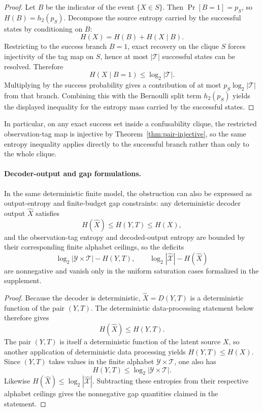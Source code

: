 \begin{proof}
Let $B$ be the indicator of the event $\{X\in S\}$. Then $\Pr[B=1]=p_S$, so $H(B)=h_2(p_S)$. Decompose the source entropy carried by the successful states by conditioning on $B$:
\[
H(X)=H(B)+H(X\mid B).
\]
Restricting to the success branch $B=1$, exact recovery on the clique $S$ forces injectivity of the tag map on $S$, hence at most $|\mathcal T|$ successful states can be resolved. Therefore
\[
H(X\mid B=1) \le \log_2 |\mathcal T|.
\]
Multiplying by the success probability gives a contribution of at most $p_S\log_2 |\mathcal T|$ from that branch. Combining this with the Bernoulli split term $h_2(p_S)$ yields the displayed inequality for the entropy mass carried by the successful states.
\end{proof}

In particular, on any exact success set inside a confusability clique, the restricted observation-tag map is injective by Theorem~\ref{thm:pair-injective}, so the same entropy inequality applies directly to the successful branch rather than only to the whole clique.

\paragraph{Decoder-output and gap formulations.}
In the same deterministic finite model, the obstruction can also be expressed as output-entropy and finite-budget gap constraints: any deterministic decoder output $\hat X$ satisfies
\[
H(\hat X)\le H(Y,T)\le H(X),
\]
and the observation-tag entropy and decoded-output entropy are bounded by their corresponding finite alphabet ceilings, so the deficits
\[
\log_2 |\mathcal Y\times \mathcal T|-H(Y,T),
\qquad
\log_2 |\widehat{\mathcal X}|-H(\hat X)
\]
are nonnegative and vanish only in the uniform saturation cases formalized in the supplement. 

\begin{proof}
Because the decoder is deterministic, $\hat X=D(Y,T)$ is a deterministic function of the pair $(Y,T)$. The deterministic data-processing statement below therefore gives
\[
H(\hat X)\le H(Y,T).
\]
The pair $(Y,T)$ is itself a deterministic function of the latent source $X$, so another application of deterministic data processing yields $H(Y,T)\le H(X)$. Since $(Y,T)$ takes values in the finite alphabet $\mathcal Y\times\mathcal T$, one also has
\[
H(Y,T)\le \log_2 |\mathcal Y\times\mathcal T|.
\]
Likewise $H(\hat X)\le \log_2 |\widehat{\mathcal X}|$. Subtracting these entropies from their respective alphabet ceilings gives the nonnegative gap quantities claimed in the statement.
\end{proof}

